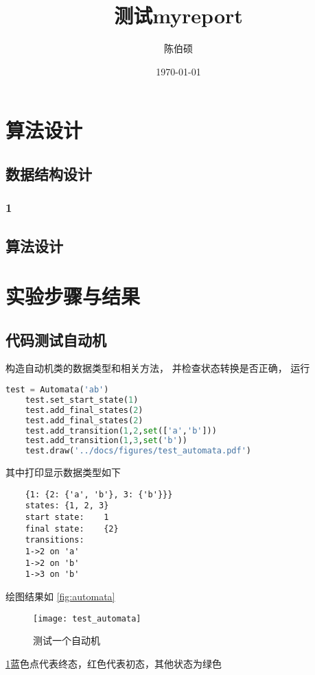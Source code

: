 \documentclass[pdfCover]{myreport} %
\title{测试myreport}
\author{陈伯硕}
\date{\today}
\begin{document}
\maketitle
\pagestyle{empty}

\setcounter{section}{3}
\section{算法设计}
  \subsection{数据结构设计}
    \subsubsection{1}
  \subsection{算法设计}
\section{实验步骤与结果}
  \subsection{代码测试自动机}
    构造自动机类的数据类型和相关方法，
    并检查状态转换是否正确，
    运行
    \begin{lstlisting}[language=python,numbers=none]
    test = Automata('ab')
    test.set_start_state(1)
    test.add_final_states(2)
    test.add_final_states(2)
    test.add_transition(1,2,set(['a','b']))
    test.add_transition(1,3,set('b'))
    test.draw('../docs/figures/test_automata.pdf')
    \end{lstlisting}
    其中打印显示数据类型如下
    \begin{lstlisting}
    {1: {2: {'a', 'b'}, 3: {'b'}}}
    states: {1, 2, 3}
    start state:    1
    final state:    {2}
    transitions:
    1->2 on 'a'
    1->2 on 'b'
    1->3 on 'b'
    \end{lstlisting}

    绘图结果如%
    \cref{fig:automata}
    \begin{figure}[H]
      \centering
      \texttt{[image: test\_automata]}
      \caption{测试一个自动机}
      \label{fig:testautomata}
    \end{figure}
    \cref{fig:testautomata}蓝色点代表终态，红色代表初态，其他状态为绿色
\end{document}
